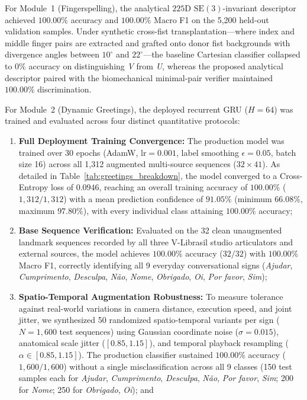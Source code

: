 \documentclass[12pt,a4paper]{article}
\begin{document}
For Module~1 (Fingerspelling), the analytical $225\text{D}$ $\text{SE}(3)$-invariant descriptor achieved $100.00\%$ accuracy and $100.00\%$ Macro F1 on the 5,200 held-out validation samples. Under synthetic cross-fist transplantation---where index and middle finger pairs are extracted and grafted onto donor fist backgrounds with divergence angles between $10^\circ$ and $22^\circ$---the baseline Cartesian classifier collapsed to $0\%$ accuracy on distinguishing \textit{V} from \textit{U}, whereas the proposed analytical descriptor paired with the biomechanical minimal-pair verifier maintained $100.00\%$ discrimination.

For Module~2 (Dynamic Greetings), the deployed recurrent GRU ($H=64$) was trained and evaluated across four distinct quantitative protocols:
\begin{enumerate}
    \item \textbf{Full Deployment Training Convergence:} The production model was trained over 30 epochs (AdamW, $\text{lr}=0.001$, label smoothing $\epsilon=0.05$, batch size 16) across all 1,312 augmented multi-source sequences ($32 \times 41$). As detailed in Table~\ref{tab:greetings_breakdown}, the model converged to a Cross-Entropy loss of $0.0946$, reaching an overall training accuracy of $\mathbf{100.00\%}$ ($1{,}312/1{,}312$) with a mean prediction confidence of $\mathbf{91.05\%}$ (minimum $66.08\%$, maximum $97.80\%$), with every individual class attaining $100.00\%$ accuracy;

    \item \textbf{Base Sequence Verification:} Evaluated on the 32 clean unaugmented landmark sequences recorded by all three V-Librasil studio articulators and external sources, the model achieves $100.00\%$ accuracy ($32/32$) with $100.00\%$ Macro F1, correctly identifying all 9 everyday conversational signs (\textit{Ajudar}, \textit{Cumprimento}, \textit{Desculpa}, \textit{N\~ao}, \textit{Nome}, \textit{Obrigado}, \textit{Oi}, \textit{Por favor}, \textit{Sim});

    \item \textbf{Spatio-Temporal Augmentation Robustness:} To measure tolerance against real-world variations in camera distance, execution speed, and joint jitter, we synthesized 50 randomized spatio-temporal variants per sign ($N = 1{,}600$ test sequences) using Gaussian coordinate noise ($\sigma = 0.015$), anatomical scale jitter ($[0.85, 1.15]$), and temporal playback resampling ($\alpha \in [0.85, 1.15]$). The production classifier sustained $100.00\%$ accuracy ($1{,}600/1{,}600$) without a single misclassification across all 9 classes (150 test samples each for \textit{Ajudar}, \textit{Cumprimento}, \textit{Desculpa}, \textit{N\~ao}, \textit{Por favor}, \textit{Sim}; 200 for \textit{Nome}; 250 for \textit{Obrigado}, \textit{Oi}); and


\end{enumerate}
\end{document}
